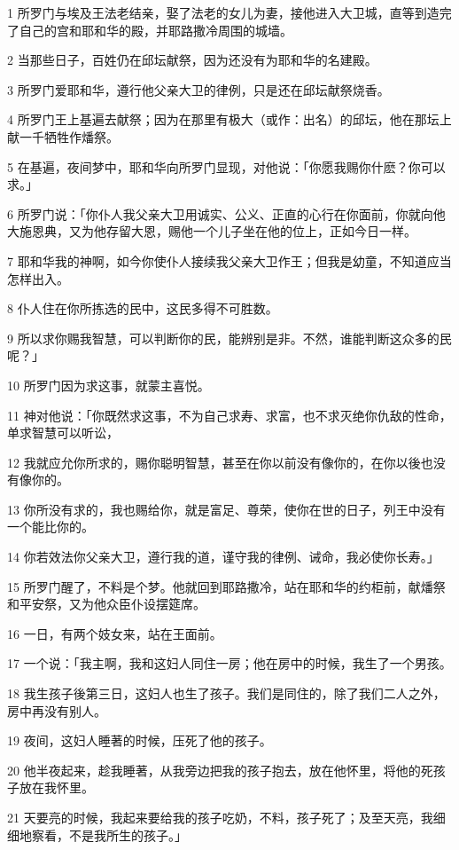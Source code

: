 \par 1 所罗门与埃及王法老结亲，娶了法老的女儿为妻，接他进入大卫城，直等到造完了自己的宫和耶和华的殿，并耶路撒冷周围的城墙。
\par 2 当那些日子，百姓仍在邱坛献祭，因为还没有为耶和华的名建殿。
\par 3 所罗门爱耶和华，遵行他父亲大卫的律例，只是还在邱坛献祭烧香。
\par 4 所罗门王上基遍去献祭；因为在那里有极大（或作：出名）的邱坛，他在那坛上献一千牺牲作燔祭。
\par 5 在基遍，夜间梦中，耶和华向所罗门显现，对他说：「你愿我赐你什麽？你可以求。」
\par 6 所罗门说：「你仆人我父亲大卫用诚实、公义、正直的心行在你面前，你就向他大施恩典，又为他存留大恩，赐他一个儿子坐在他的位上，正如今日一样。
\par 7 耶和华我的神啊，如今你使仆人接续我父亲大卫作王；但我是幼童，不知道应当怎样出入。
\par 8 仆人住在你所拣选的民中，这民多得不可胜数。
\par 9 所以求你赐我智慧，可以判断你的民，能辨别是非。不然，谁能判断这众多的民呢？」
\par 10 所罗门因为求这事，就蒙主喜悦。
\par 11 神对他说：「你既然求这事，不为自己求寿、求富，也不求灭绝你仇敌的性命，单求智慧可以听讼，
\par 12 我就应允你所求的，赐你聪明智慧，甚至在你以前没有像你的，在你以後也没有像你的。
\par 13 你所没有求的，我也赐给你，就是富足、尊荣，使你在世的日子，列王中没有一个能比你的。
\par 14 你若效法你父亲大卫，遵行我的道，谨守我的律例、诫命，我必使你长寿。」
\par 15 所罗门醒了，不料是个梦。他就回到耶路撒冷，站在耶和华的约柜前，献燔祭和平安祭，又为他众臣仆设摆筵席。
\par 16 一日，有两个妓女来，站在王面前。
\par 17 一个说：「我主啊，我和这妇人同住一房；他在房中的时候，我生了一个男孩。
\par 18 我生孩子後第三日，这妇人也生了孩子。我们是同住的，除了我们二人之外，房中再没有别人。
\par 19 夜间，这妇人睡著的时候，压死了他的孩子。
\par 20 他半夜起来，趁我睡著，从我旁边把我的孩子抱去，放在他怀里，将他的死孩子放在我怀里。
\par 21 天要亮的时候，我起来要给我的孩子吃奶，不料，孩子死了；及至天亮，我细细地察看，不是我所生的孩子。」

